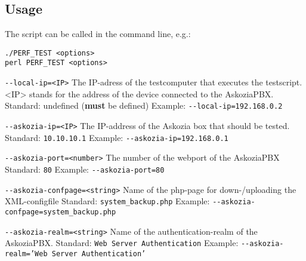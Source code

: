 \subsection{Usage}%
The script can be called in the command line, e.g.: 

\begin{lstlisting}[breaklines=true,label=code:script-call,caption={Aufruf des Scripts} ]
./PERF_TEST <options>
perl PERF_TEST <options>
\end{lstlisting}

\begin{description}
\item {\texttt{-{}-local-ip=<IP>}} \newline
The IP-adress of the testcomputer that executes the testscript.
<IP> stands for the address of the device connected to the AskoziaPBX.
\newline Standard: undefined (\textbf{must} be defined)
\newline Example: \texttt{-{}-local-ip=192.168.0.2}

\item {\texttt{-{}-askozia-ip=<IP>}} \newline
The IP-address of the Askozia box that should be tested.
\newline Standard: \texttt{10.10.10.1}
\newline Example: \texttt{-{}-askozia-ip=192.168.0.1}

\item {\texttt{-{}-askozia-port=<number>}} \newline
The number of the webport of the AskoziaPBX
\newline Standard: \texttt{80}
\newline Example: \texttt{-{}-askozia-port=80}

\item {\texttt{-{}-askozia-confpage=<string>}} \newline
Name of the php-page for down-/uploading the XML-configfile
\newline Standard: \texttt{system\_backup.php}
\newline Example: \texttt{-{}-askozia-confpage=system\_backup.php}

\item {\texttt{-{}-askozia-realm=<string>}} \newline
Name of the authentication-realm of the AskoziaPBX.
\newline Standard: \texttt{Web Server Authentication}
\newline Example: \texttt{-{}-askozia-realm='Web Server Authentication'}


\end{description}
